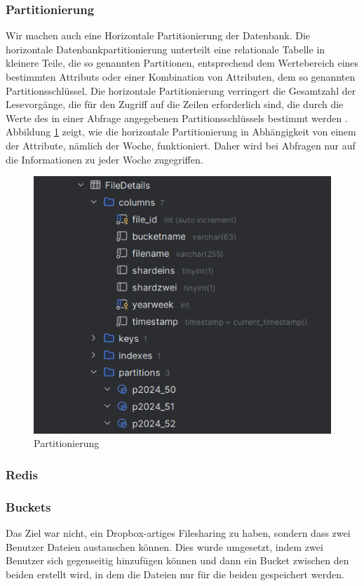 \documentclass[12pt]{report}
\begin{document}
			\subsubsection{Partitionierung}
				Wir machen auch eine Horizontale Partitionierung der Datenbank. Die horizontale Datenbankpartitionierung unterteilt eine relationale Tabelle in kleinere Teile, die so genannten Partitionen, entsprechend dem Wertebereich eines bestimmten Attributs oder einer Kombination von Attributen, dem so genannten Partitionsschlüssel. Die horizontale Partitionierung verringert die Gesamtzahl der Lesevorgänge, die für den Zugriff auf die Zeilen erforderlich sind, die durch die Werte des in einer Abfrage angegebenen Partitionsschlüssels bestimmt werden \cite{alsultanny2010database}. Abbildung \ref{fig:partitionierung} zeigt, wie die horizontale Partitionierung in Abhängigkeit von einem der Attribute, nämlich der Woche, funktioniert. Daher wird bei Abfragen nur auf die Informationen zu jeder Woche zugegriffen.
				
				\begin{figure}[h]
					\centering
					\includegraphics[width=0.8\linewidth]{partitionierung}
					\caption{Partitionierung}
					\label{fig:partitionierung}
				\end{figure}
				
				\subsubsection{Redis}
				
				\subsubsection{Buckets}
					Das Ziel war nicht, ein Dropbox-artiges Filesharing zu haben, sondern dass zwei Benutzer Dateien austauschen können. Dies wurde umgesetzt, indem zwei Benutzer sich gegenseitig hinzufügen können und dann ein Bucket zwischen den beiden erstellt wird, in dem die Dateien nur für die beiden gespeichert werden.
			
\end{document}
